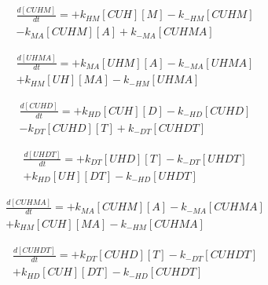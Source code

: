 \begin{equation}
\begin{split}
\frac{d[CUHM]}{dt} = + k_{HM}[CUH][M] - k_{-HM}[CUHM] \\%
                     - k_{MA}[CUHM][A] + k_{-MA}[CUHMA] %
\end{split}
\end{equation}

\begin{equation}
\begin{split}
\frac{d[UHMA]}{dt} = + k_{MA}[UHM][A] - k_{-MA}[UHMA] \\%
                     + k_{HM}[UH][MA] - k_{-HM}[UHMA] %
\end{split}
\end{equation}

\begin{equation}
\begin{split}
\frac{d[CUHD]}{dt} = + k_{HD}[CUH][D] - k_{-HD}[CUHD] \\%
                     - k_{DT}[CUHD][T] + k_{-DT}[CUHDT] %
\end{split}
\end{equation}

\begin{equation}
\begin{split}
\frac{d[UHDT]}{dt} = + k_{DT}[UHD][T] - k_{-DT}[UHDT] \\%
                     + k_{HD}[UH][DT] - k_{-HD}[UHDT] %
\end{split}
\end{equation}

\begin{equation}
\begin{split}
\frac{d[CUHMA]}{dt} = + k_{MA}[CUHM][A] - k_{-MA}[CUHMA]\\ %
                     + k_{HM}[CUH][MA] - k_{-HM}[CUHMA] %
\end{split}
\end{equation}

\begin{equation}
\begin{split}
\frac{d[CUHDT]}{dt} = + k_{DT}[CUHD][T] - k_{-DT}[CUHDT]\\ %
                     + k_{HD}[CUH][DT] - k_{-HD}[CUHDT] %
\end{split}
\end{equation}


